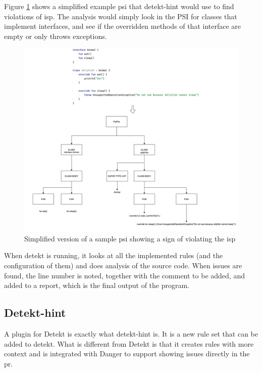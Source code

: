 \documentclass{report}
\begin{document}
Figure \ref{fig:psi} shows a simplified example \gls{psi} that detekt-hint would use to find violations of \gls{isp}. The analysis would simply look in the PSI for classes that implement interfaces, and see if the overridden methods of that interface are empty or only throws exceptions. 

\begin{figure}[h!]
    \centering
    \includegraphics[width=\linewidth]{report/images/psi.png}
    \caption{Simplified version of a sample \gls{psi} showing a sign of violating the \gls{isp}}
    \label{fig:psi}
\end{figure}

When detekt is running, it looks at all the implemented rules (and the configuration of them) and does analysis of the source code. When issues are found, the line number is noted, together with the comment to be added, and added to a report, which is the final output of the program. 

\subsection{Detekt-hint}
A plugin for Detekt is exactly what detekt-hint is. It is a new rule set that can be added to detekt. What is different from Detekt is that it creates rules with more context and is integrated with Danger to support showing issues directly in the \gls{pr}.
\end{document}
